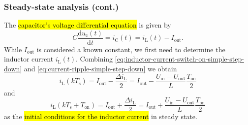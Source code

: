\begin{frame}
    \frametitle{Steady-state analysis (cont.)}
     The \hl{capacitor's voltage differential equation} is given by
    \begin{equation}
        C \frac{\mathrm{d}u_\mathrm{c}(t)}{\mathrm{d}t} = i_\mathrm{C}(t) = i_\mathrm{L}(t) - I_\mathrm{out}.
        \label{eq:capacitor-voltage-differential-equation-step-down-converter}
    \end{equation}
    While $I_\mathrm{out}$ is considered a known constant, we first need to determine the inductor current $i_\mathrm{L}(t)$. Combining \eqref{eq:inductor-current-switch-on-simple-step-down} and \eqref{eq:current-ripple-simple-step-down} we obtain
    \begin{equation}
         i_\mathrm{L}(k T_\mathrm{s})  = I_\mathrm{out} - \frac{\Delta i_\mathrm{L}}{2} = I_\mathrm{out} - \frac{U_\mathrm{in} - U_\mathrm{out}}{L} \frac{T_\mathrm{on}}{2}
    \end{equation}
    and
    \begin{equation}
        i_\mathrm{L}(k T_\mathrm{s} + T_\mathrm{on})  = I_\mathrm{out} + \frac{\Delta i_\mathrm{L}}{2} = I_\mathrm{out} + \frac{U_\mathrm{in} - U_\mathrm{out}}{L} \frac{T_\mathrm{on}}{2}
   \end{equation}
    as the \hl{initial conditions for the inductor current} in steady state. 
\end{frame}

